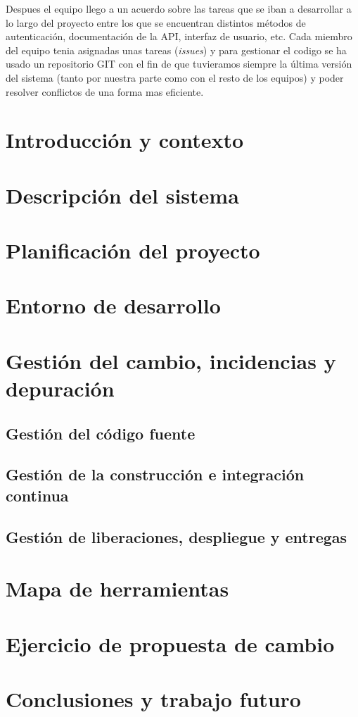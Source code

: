 \documentclass[12pt]{article}
\begin{document}
Despues el equipo llego a un acuerdo sobre las tareas que se iban a desarrollar a lo largo del proyecto entre los que se encuentran distintos métodos de autenticación, documentación de la API, interfaz de usuario, etc. Cada miembro del equipo tenia asignadas unas tareas (\emph{issues}) y para gestionar el codigo se ha usado un repositorio GIT con el fin de que tuvieramos siempre la última versión del sistema (tanto por nuestra parte como con el resto de los equipos) y poder resolver conflictos de una forma mas eficiente.



\section{Introducción y contexto}

\section{Descripción del sistema}

\section{Planificación del proyecto}

\section{Entorno de desarrollo}

\section{Gestión del cambio, incidencias y depuración}
\subsection{Gestión del código fuente}
\subsection{Gestión de la construcción e integración continua}
\subsection{Gestión de liberaciones, despliegue y entregas}

\section{Mapa de herramientas}
\section{Ejercicio de propuesta de cambio}
\section{Conclusiones y trabajo futuro}

\newpage	


\end{document}
